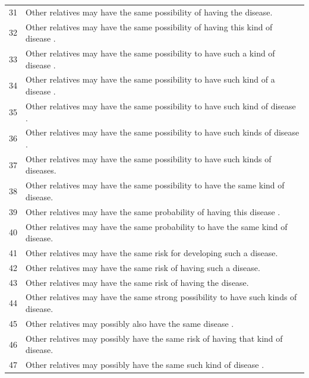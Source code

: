 \documentclass[letterpaper, 11pt]{article}
\begin{document}
\begin{table}[]
\begin{tabular}{ll}
		31                           & Other relatives may have the same possibility of having the disease.                  \\
		32                           & Other relatives may have the same possibility of having this kind of disease .        \\
		33                           & Other relatives may have the same possibility to have such a kind of disease .        \\
		34                           & Other relatives may have the same possibility to have such kind of a disease .        \\
		35                           & Other relatives may have the same possibility to have such kind of disease .          \\
		36                           & Other relatives may have the same possibility to have such kinds of disease .         \\
		37                           & Other relatives may have the same possibility to have such kinds of diseases.         \\
		38                           & Other relatives may have the same possibility to have the same kind of disease.       \\
		39                           & Other relatives may have the same probability of having this disease .                \\
		40                           & Other relatives may have the same probability to have the same kind of disease.       \\
		41                           & Other relatives may have the same risk for developing such a disease.                 \\
		42                           & Other relatives may have the same risk of having such a disease.                      \\
		43                           & Other relatives may have the same risk of having the disease.                         \\
		44                           & Other relatives may have the same strong possibility to have such kinds of disease.   \\
		45                           & Other relatives may possibly also have the same disease .                             \\
		46                           & Other relatives may possibly have the same risk of having that kind of disease.       \\
		47                           & Other relatives may possibly have the same such kind of disease .                     \\

\end{tabular}
\end{table}
\end{document}
